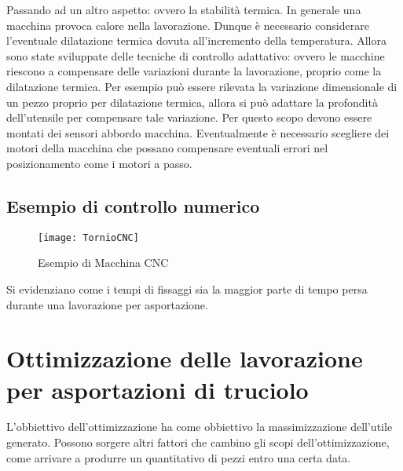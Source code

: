 Passando ad un altro aspetto: ovvero la stabilità termica.
In generale una macchina provoca calore nella lavorazione. Dunque è necessario considerare l'eventuale dilatazione termica dovuta all'incremento della temperatura.
Allora sono state sviluppate delle tecniche di controllo adattativo: ovvero le macchine riescono a compensare delle variazioni durante la lavorazione, proprio come la dilatazione termica. 
Per esempio può essere rilevata la variazione dimensionale di un pezzo proprio per dilatazione termica, allora si può adattare la profondità dell'utensile per compensare tale variazione. 
Per questo scopo devono essere montati dei sensori abbordo macchina.
Eventualmente è necessario scegliere dei motori della macchina che possano compensare eventuali errori nel posizionamento come i motori a passo.

\subsection{Esempio di controllo numerico}
\begin{figure}
\centering
\texttt{[image: TornioCNC]}
\caption{Esempio di Macchina CNC}
\label{fig:TornioCNC}
\end{figure}
Si evidenziano come i tempi di fissaggi sia la maggior parte di tempo persa durante una lavorazione per asportazione.

\section{Ottimizzazione delle lavorazione per asportazioni di truciolo}
L'obbiettivo dell'ottimizzazione ha come obbiettivo la massimizzazione dell'utile generato.
Possono sorgere altri fattori che cambino gli scopi dell'ottimizzazione, come arrivare a produrre un quantitativo di pezzi entro una certa data.

